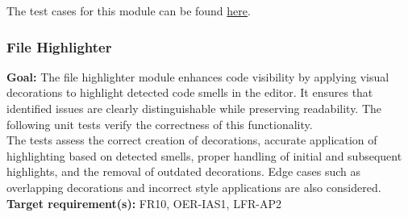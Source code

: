 \documentclass[12pt, titlepage]{article}
\begin{document}
\noindent The test cases for this module can be found \href{https://github.com/ssm-lab/capstone--sco-vs-code-plugin/blob/plugin-multi-file/test/utils/hashDocs.test.ts}{here}.


\subsubsection{File Highlighter}

\textbf{Goal:} The file highlighter module enhances code visibility by applying visual decorations to highlight detected code smells in the editor. It ensures that identified issues are clearly distinguishable while preserving readability. The following unit tests verify the correctness of this functionality.\\

\noindent The tests assess the correct creation of decorations, accurate application of highlighting based on detected smells, proper handling of initial and subsequent highlights, and the removal of outdated decorations. Edge cases such as overlapping decorations and incorrect style applications are also considered.\\

\noindent\textbf{Target requirement(s):} FR10, OER-IAS1, LFR-AP2~\cite{SRS} \\
\end{document}
